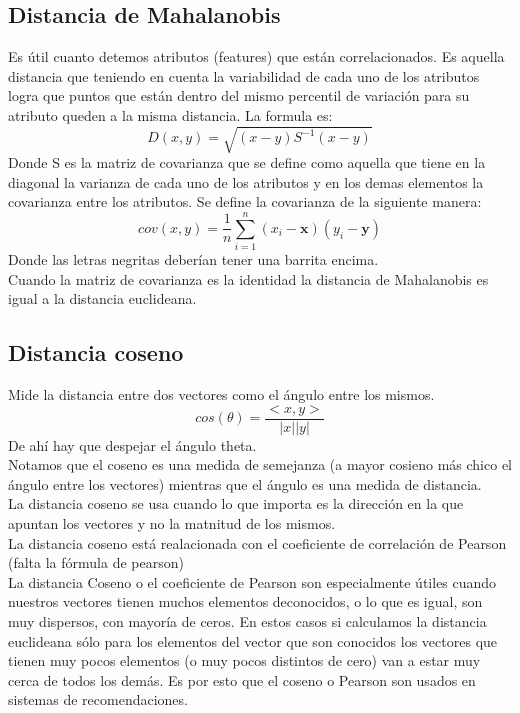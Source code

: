 \documentclass[titlepage,a4paper]{article}
\begin{document}
\subsection*{Distancia de Mahalanobis}
Es útil cuanto detemos atributos (features) que están correlacionados. Es aquella distancia que teniendo en cuenta la variabilidad de cada uno de los atributos logra que puntos que están dentro del mismo percentil de variación para su atributo queden a la misma distancia. La formula es: 
$$D(x,y) = \sqrt{(x-y)S^{-1}(x-y)}$$
Donde S es la matriz de covarianza que se define como aquella que tiene en la diagonal la varianza de cada uno de los atributos y en los demas elementos la covarianza entre los atributos. Se define la covarianza de la siguiente manera: 
$$cov(x,y) = \frac{1}{n} \displaystyle\sum_{i=1}^n(x_i-\textbf{x})(y_i-\textbf{y})$$
Donde las letras negritas deberían tener una barrita encima. \\

Cuando la matriz de covarianza es la identidad la distancia de Mahalanobis es igual a la distancia euclideana. \\

\subsection*{Distancia coseno}
Mide la distancia entre dos vectores como el ángulo entre los mismos. 
$$cos(\theta) = \frac{<x,y>}{|x||y|} $$
De ahí hay que despejar el ángulo theta. \\

Notamos que el coseno es una medida de semejanza (a mayor cosieno más chico el ángulo entre los vectores) mientras que el ángulo es una medida de distancia. \\

La distancia coseno se usa cuando lo que importa es la dirección en la que apuntan los vectores y no la matnitud de los mismos. \\

La distancia coseno está realacionada con el coeficiente de correlación de Pearson (falta la fórmula de pearson)\\
La distancia Coseno o el coeficiente de Pearson son especialmente útiles cuando nuestros vectores tienen muchos elementos deconocidos, o lo que es igual, son muy dispersos, con mayoría de ceros. En estos casos si calculamos la distancia euclideana sólo para los elementos del vector que son conocidos los vectores que tienen muy pocos elementos (o muy pocos distintos de cero) van a estar muy cerca de todos los demás. Es por esto que el coseno o Pearson son usados en sistemas de recomendaciones. \\
\end{document}
